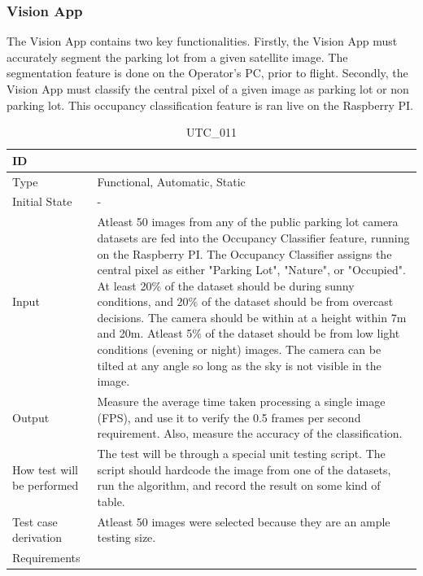 \documentclass[12pt, titlepage]{article}
\begin{document}
\clearpage

\subsubsection{Vision App}

The Vision App contains two key functionalities. Firstly, the Vision App must accurately segment the parking lot from a given satellite image. The segmentation feature is done on the Operator's PC, prior to flight. Secondly, the Vision App must classify the central pixel of a given image as parking lot or non parking lot. This occupancy classification feature is ran live on the Raspberry PI.  

\begin{table}[!h]
\begin{center}
\caption {UTC\_011}
\label{tab:UTC_011}
\begin{tabular}{ | m{3.2cm} | m{12.2cm} | } 
\hline
ID & \nameref{tab:UTC_011} \\ 
\hline
Type &  Functional, Automatic, Static  \\ 
\hline
Initial State & -\\ 
\hline
Input &  Atleast 50 images from any of the public parking lot camera datasets are fed into the Occupancy Classifier feature, running on the Raspberry PI. The Occupancy Classifier assigns the central pixel as either "Parking Lot", "Nature", or "Occupied". At least 20\% of the dataset should be during sunny conditions, and 20\% of the dataset should be from overcast decisions. The camera should be within at a height within 7m and 20m. Atleast 5\% of the dataset should be from low light conditions (evening or night) images. The camera can be tilted at any angle so long as the sky is not visible in the image.\\ 
\hline
Output &  Measure the average time taken processing a single image (FPS), and use it to verify the 0.5 frames per second requirement. Also, measure the accuracy of the classification. \\ 
\hline
How test will be performed & The test will be through a special unit testing script. The script should hardcode the image from one of the datasets, run the algorithm, and record the result on some kind of table. \\ 
\hline
Test case derivation & Atleast 50 images were selected because they are an ample testing size.   \\ 
\hline
Requirements & \nameref{GEN_005} \\ 
\hline
\end{tabular}
\end{center}
\end{table}
\end{document}
